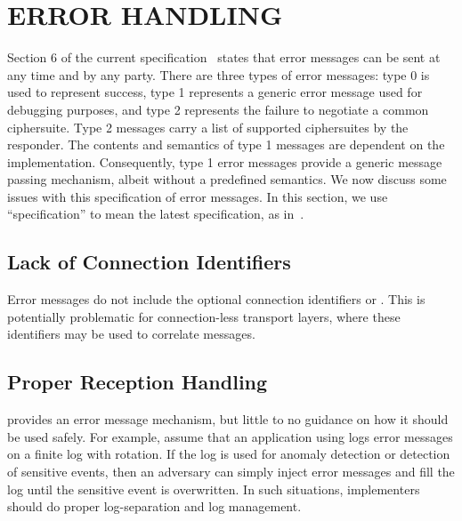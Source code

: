 \documentclass[runningheads]{llncs}
\begin{document}
\section{\uppercase{Error Handling}}
\label{sec:errorHandling}
Section 6 of the current \mEdhoc{}
specification~\cite{draft-ietf-lake-edhoc-15}
states that error messages can be sent at any time and by any party.
%
There are three types of error messages: type 0 is used to represent success,
type 1 represents a generic error message used for debugging purposes, and
type 2 represents the failure to negotiate a common ciphersuite.
%
Type 2 messages carry a list of supported ciphersuites by the responder.
%
The contents and semantics of type 1 messages are dependent on the
implementation.
%
Consequently, type 1 error messages provide a generic message passing
mechanism, albeit without a predefined semantics.
%
We now discuss some issues with this specification of error messages.
%
In this section, we use ``specification'' to mean the latest specification, as
in~\cite{draft-ietf-lake-edhoc-15}.

\subsection{Lack of Connection Identifiers}
Error messages do not include the optional connection identifiers \mCi{} or
\mCr{}.
%
This is potentially problematic for connection-less transport layers, where
these identifiers may be used to correlate messages.

\subsection{Proper Reception Handling}
\mEdhoc{} provides an error message mechanism, but little to no guidance on
how it should be used safely.
%
For example, assume that an application using \mEdhoc{} logs error messages
on a finite log with rotation.
%
If the log is used for anomaly detection or detection of sensitive events, then
an adversary can simply inject error messages and fill the log until the
sensitive event is overwritten.
%
In such situations, implementers should do proper log-separation and log
management.
\end{document}
